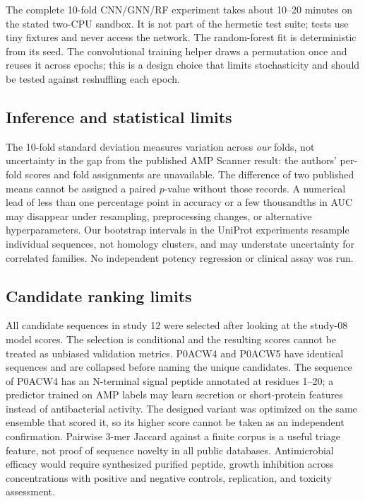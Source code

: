 The complete 10-fold CNN/GNN/RF experiment takes about 10--20 minutes on
the stated two-CPU sandbox. It is not part of the hermetic test suite; tests
use tiny fixtures and never access the network. The random-forest fit is
deterministic from its seed. The convolutional training helper draws a
permutation once and reuses it across epochs; this is a design choice that
limits stochasticity and should be tested against reshuffling each epoch.

\subsection{Inference and statistical limits}
The 10-fold standard deviation measures variation across \emph{our} folds,
not uncertainty in the gap from the published AMP Scanner result: the authors'
per-fold scores and fold assignments are unavailable. The difference of two
published means cannot be assigned a paired $p$-value without those records.
A numerical lead of less than one percentage point in accuracy or a few
thousandths in AUC may disappear under resampling, preprocessing changes,
or alternative hyperparameters. Our bootstrap intervals in the UniProt
experiments resample individual sequences, not homology clusters, and may
understate uncertainty for correlated families. No independent potency
regression or clinical assay was run.

\subsection{Candidate ranking limits}
All candidate sequences in study 12 were selected after looking at the
study-08 model scores. The selection is conditional and the resulting scores
cannot be treated as unbiased validation metrics. P0ACW4 and P0ACW5 have
identical sequences and are collapsed before naming the unique candidates.
The sequence of P0ACW4 has an N-terminal signal peptide annotated at residues
1--20; a predictor trained on AMP labels may learn secretion or short-protein
features instead of antibacterial activity. The designed variant was
optimized on the same ensemble that scored it, so its higher score cannot
be taken as an independent confirmation. Pairwise 3-mer Jaccard against a
finite corpus is a useful triage feature, not proof of sequence novelty
in all public databases. Antimicrobial efficacy would require synthesized
purified peptide, growth inhibition across concentrations with positive and
negative controls, replication, and toxicity assessment.
